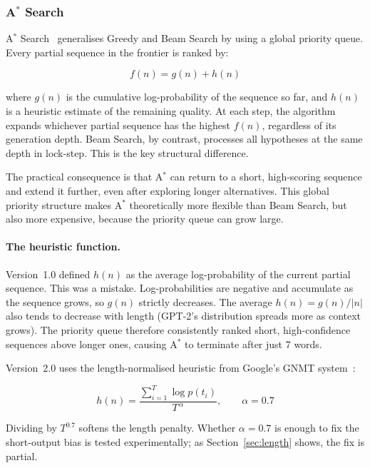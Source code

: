 \documentclass[12pt]{article}
\begin{document}
	\subsubsection{A$^*$ Search}
	\label{sec:astar_theory}
	
	A$^*$ Search~\cite{hart1968astar} generalises Greedy and Beam Search by using a global priority queue. Every partial sequence in the frontier is ranked by:
	
	\begin{equation}
		f(n) = g(n) + h(n)
		\label{eq:astar_f}
	\end{equation}
	
	where $g(n)$ is the cumulative log-probability of the sequence so far, and $h(n)$ is a heuristic estimate of the remaining quality. At each step, the algorithm expands whichever partial sequence has the highest $f(n)$, regardless of its generation depth. Beam Search, by contrast, processes all hypotheses at the same depth in lock-step. This is the key structural difference.
	
	The practical consequence is that A$^*$ can return to a short, high-scoring sequence and extend it further, even after exploring longer alternatives. This global priority structure makes A$^*$ theoretically more flexible than Beam Search, but also more expensive, because the priority queue can grow large.
	
	\paragraph{The heuristic function.}
	Version~1.0 defined $h(n)$ as the average log-probability of the current partial sequence. This was a mistake. Log-probabilities are negative and accumulate as the sequence grows, so $g(n)$ strictly decreases. The average $h(n) = g(n) / |n|$ also tends to decrease with length (GPT-2's distribution spreads more as context grows). The priority queue therefore consistently ranked short, high-confidence sequences above longer ones, causing A$^*$ to terminate after just 7 words.
	
	Version~2.0 uses the length-normalised heuristic from Google's GNMT system~\cite{wu2016gnmt}:
	
	\begin{equation}
		h(n) = \frac{\sum_{i=1}^{T} \log p(t_i)}{T^{\,\alpha}}, \qquad \alpha = 0.7
		\label{eq:heuristic}
	\end{equation}
	
	Dividing by $T^{0.7}$ softens the length penalty. Whether $\alpha = 0.7$ is enough to fix the short-output bias is tested experimentally; as Section~\ref{sec:length} shows, the fix is partial.
	
\end{document}
